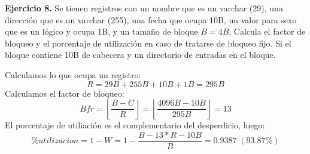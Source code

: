 \documentclass[12pt]{report}
\newcommand{\floor}[1]{\left\lfloor #1 \right\rfloor}
\begin{document}
\textbf{Ejercicio 8.} Se tienen registros con un nombre que es un varchar (29), una dirección que es un varchar (255), una fecha que ocupa 10B, un valor para sexo que es un lógico y ocupa 1B, y un tamaño de bloque $B=4B$. Calcula el factor de bloqueo y el porcentaje de utilización en caso de tratarse de bloqueo fijo. Si el bloque contiene 10B de cabecera y un directorio de entradas en el bloque.

Calculamos lo que ocupa un registro:
\[
R=29B+255B+10B+1B=295B
\]
Calculamos el factor de bloqueo:
\[
Bfr=\floor{\frac{B-C}{R}}=\floor{\frac{4096B-10B}{295B}}=13
\]
El porcentaje de utiliación es el complementario del desperdicio, luego:
\[
\% utilizacion = 1-W = 1-\frac{B-13*R-10B}{B}=0.9387 \; (93.87\%)
\]
\end{document}
